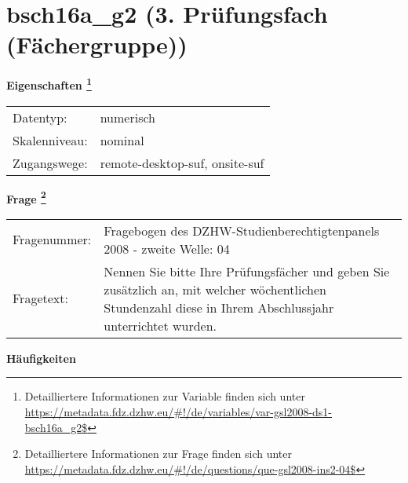 
    \setcounter{footnote}{0}

    \vspace*{-1.8cm}
	\section{bsch16a\_g2 (3. Prüfungsfach (Fächergruppe))}
	\label{section:bsch16a_g2}



    \vspace*{0.5cm}
    \noindent\textbf{Eigenschaften
	\footnote{Detailliertere Informationen zur Variable finden sich unter
		\url{https://metadata.fdz.dzhw.eu/\#!/de/variables/var-gsl2008-ds1-bsch16a_g2$}}}\\
	\begin{tabularx}{\hsize}{@{}lX}
	Datentyp: & numerisch \\
	Skalenniveau: & nominal \\
	Zugangswege: &
	  remote-desktop-suf, 
	  onsite-suf
 \\
    \end{tabularx}



				\vspace*{0.5cm}
                \noindent\textbf{Frage
	                \footnote{Detailliertere Informationen zur Frage finden sich unter
		              \url{https://metadata.fdz.dzhw.eu/\#!/de/questions/que-gsl2008-ins2-04$}}}\\
				\begin{tabularx}{\hsize}{@{}lX}
					Fragenummer: &
					  Fragebogen des DZHW-Studienberechtigtenpanels 2008 - zweite Welle:
					  04
 \\
					Fragetext: & Nennen Sie bitte Ihre Prüfungsfächer und geben Sie zusätzlich an, mit welcher wöchentlichen Stundenzahl diese in Ihrem Abschlussjahr unterrichtet wurden. \\
				\end{tabularx}





        		\vspace*{0.5cm}
                \noindent\textbf{Häufigkeiten}

